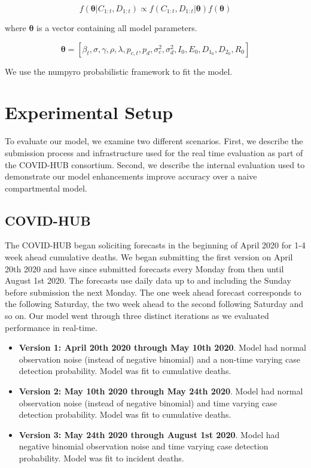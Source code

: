 \documentclass[11pt]{amsart}
\begin{document}
$$f(\bm{\theta} | C_{1:t},D_{1:t}) \propto f(C_{1:t},D_{1:t} | \bm{\theta})f(\bm{\theta})$$

where $\bm{\theta}$ is a vector containing all model parameters. 

$$\bm{\theta} =[\beta_{t} ,
\sigma ,
\gamma ,
\rho ,
\lambda ,
p_{c,t} ,
p_{d} ,
\sigma_c^2 ,
\sigma_d^2 ,
I_0 ,
E_0 ,
D_{1_0} ,
D_{2_0} ,
R_0 ]$$


We use the numpyro probabilistic framework to fit the model. 

%
%   
%   
%   
 \section{Experimental Setup}
 To evaluate our model, we examine two different scenarios. First, we describe the submission process and infrastructure used for the real time evaluation as part of the COVID-HUB consortium. Second, we describe the internal evaluation used to demonstrate our model enhancements improve accuracy over a naive compartmental model. 
 
 \subsection{COVID-HUB}
 The COVID-HUB began soliciting forecasts in the beginning of April 2020 for 1-4 week ahead cumulative deaths. We began submitting the first version on April 20th 2020 and have since submitted forecasts every Monday from then until August 1st 2020. The forecasts use daily data up to and including the Sunday before submission the next Monday. The one week ahead forecast corresponds to the following Saturday, the two week ahead to the second following Saturday and so on. Our model went through three distinct iterations as we evaluated performance in real-time. 
 
 \begin{itemize}
 
 \item \textbf{Version 1: April 20th 2020 through May 10th 2020}. Model had normal observation noise (instead of negative binomial) and a non-time varying case detection probability. Model was fit to cumulative deaths. 
  \item \textbf{Version 2: May 10th 2020 through May 24th 2020}. Model had normal observation noise (instead of negative binomial) and time varying case detection probability. Model was fit to cumulative deaths. 
    \item \textbf{Version 3: May 24th 2020 through August 1st 2020}. Model had negative binomial observation noise  and time varying case detection probability. Model was fit to incident deaths. 
 \end{itemize} 
 
\end{document}
